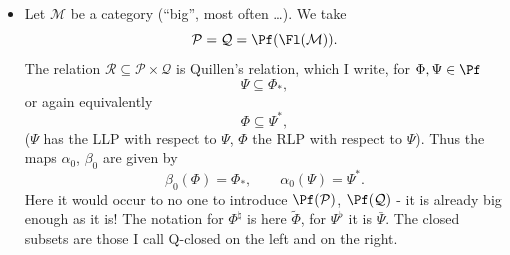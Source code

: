 \begin{itemize}[leftmargin=2.5em]
\item[6)] Let $\mathcal{M}$ be a category (``big'', most often \dots). We take
\[
\mathcal{P}=\mathcal{Q}=\Pf(\Fl(\mathcal{M})).
\]
The relation $\mathcal{R}\subseteq\mathcal{P}\times\mathcal{Q}$ is Quillen's relation, which I write, for $\Phi,\Psi\in\Pf$
\[
\Psi\subseteq\Phi_{*},
\]
or again equivalently
\[
\Phi\subseteq\Psi^{*},
\]
($\Psi$ has the LLP with respect to $\Psi$, $\Phi$ the RLP with respect to $\Psi$). Thus the maps $\alpha_0$, $\beta_0$ are given by %
\[
\beta_0(\Phi)=\Phi_{*},\qquad \alpha_0(\Psi)=\Psi^{*}.
\]
Here it would occur to no one to introduce $\Pf(\mathcal{P})$, $\Pf(\mathcal{Q})$ - it is already big enough as it is! The notation for $\Phi^{\natural}$ is here $\tilde{\Phi}$, for $\Psi^{\flat}$ it is $\bar{\Psi}$. The closed subsets are those I call Q-closed on the left and on the right.


\end{itemize}
